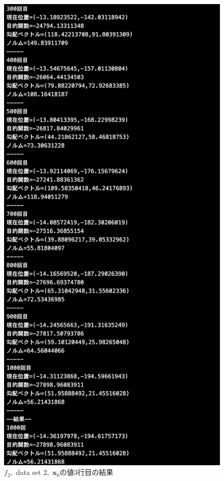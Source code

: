 \documentclass[12pt]{jarticle}
\begin{document}
\begin{figure}[h]
\begin{minipage}{0.5\hsize}
    \end{minipage}
    \begin{minipage}{0.5\hsize}
        \begin{center}
            \includegraphics[scale=0.2]{kadai1_2s_out2_3_3.png}
        \end{center}
    \end{minipage}
    \caption{$f_2$,\ data set 2,\ $\boldsymbol{x}_0$の値3行目の結果}
\end{figure}
\end{document}
